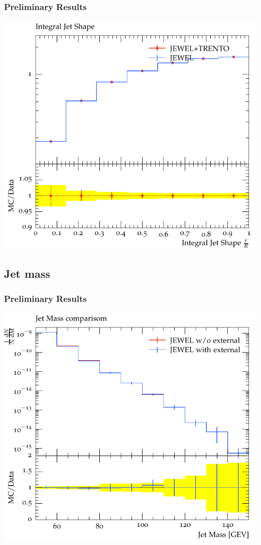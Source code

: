 \documentclass{beamer}
\begin{document}
\begin{frame}\frametitle{Preliminary Results}

        
        \begin{minipage}{1.0\textwidth}
		\includegraphics[scale=0.6]{images/Int_shape_trento.pdf}        
        \end{minipage}
\end{frame}


\subsection{Jet mass}

\begin{frame}\frametitle{Preliminary Results}

        
        \begin{minipage}{1.0\textwidth}
		\includegraphics[scale=0.6]{images/Mass_read.pdf}        
        \end{minipage}
\end{frame}
\end{document}
